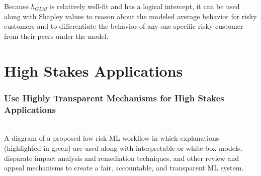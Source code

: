 \documentclass[11pt,
               aspectratio=169,
               hyperref={colorlinks}
               ]{beamer}
\begin{document}
\begin{frame}[t, label={lime}]
	\scriptsize{Because $h_{GLM}$ is relatively well-fit and has a logical intercept, it can be used along with Shapley values to reason about the modeled average behavior for risky customers and to differentiate the behavior of any one specific risky customer from their peers under the model.}

	\end{frame}


	\section{High Stakes Applications}


	\begin{frame}
	
		\frametitle{Use Highly Transparent Mechanisms for High Stakes Applications}	
		
		\\
		\vspace{5pt}
		\scriptsize{A diagram of a proposed low risk ML workflow in which explanations (highlighted in green) are used along with interpretable or white-box models, disparate impact analysis and remediation techniques, and other review and appeal mechanisms to create a fair, accountable, and transparent ML system.}
	
	\end{frame}
\end{document}
